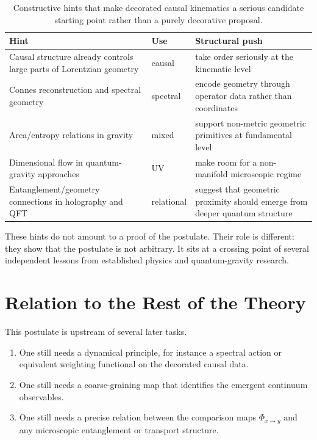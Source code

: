 \documentclass[12pt,a4paper]{article}
\theoremstyle{postulate}
\begin{document}
\begin{table}[ht]
\centering
\renewcommand{\arraystretch}{1.25}
\begin{tabular}{@{}p{}p{}p{}@{}}
\toprule
\textbf{Hint} & \textbf{Use} & \textbf{Structural push} \\
\midrule
Causal structure already controls large parts of Lorentzian geometry & causal & take order seriously at the kinematic level \\
\addlinespace
Connes reconstruction and spectral geometry & spectral & encode geometry through operator data rather than coordinates \\
\addlinespace
Area/entropy relations in gravity & mixed & support non-metric geometric primitives at fundamental level \\
\addlinespace
Dimensional flow in quantum-gravity approaches & UV & make room for a non-manifold microscopic regime \\
\addlinespace
Entanglement/geometry connections in holography and QFT & relational & suggest that geometric proximity should emerge from deeper quantum structure \\
\bottomrule
\end{tabular}
\caption{Constructive hints that make decorated causal kinematics a serious
candidate starting point rather than a purely decorative proposal.}
\label{tab:hints}
\end{table}

These hints do not amount to a proof of the postulate.  Their role is
different: they show that the postulate is not arbitrary.  It sits at a
crossing point of several independent lessons from established physics and
quantum-gravity research.

\section{Relation to the Rest of the Theory}
\label{sec:relation}

This postulate is upstream of several later tasks.
\begin{enumerate}[label=(\roman*)]
  \item One still needs a dynamical principle, for instance a spectral action
  or equivalent weighting functional on the decorated causal data.
  \item One still needs a coarse-graining map that identifies the emergent
  continuum observables.
  \item One still needs a precise relation between the comparison maps
  $\Phi_{x\to y}$ and any microscopic entanglement or transport structure.
\end{enumerate}
\end{document}
